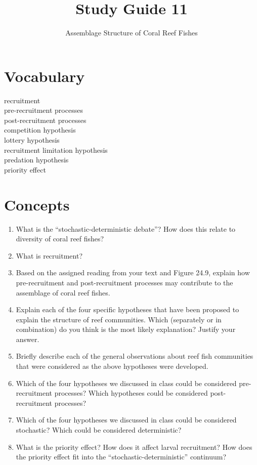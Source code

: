 \documentclass[letterpaper]{tufte-handout}
\title{Study Guide 11}
\author{Assemblage Structure of Coral Reef Fishes}
\date{} %
\begin{document}
\maketitle	%


\section{Vocabulary} 
\vspace{-1\baselineskip}
\begin{multicols}{2}
recruitment \\
pre-recruitment processes \\
post-recruitment processes \\
competition hypothesis \\
lottery hypothesis \\
recruitment limitation hypothesis \\
predation hypothesis \\
priority effect
\end{multicols}

\section{Concepts}

\begin{enumerate}
	\item What is the ``stochastic-deterministic debate''? How does this relate to diversity of coral reef fishes?

	\item What is recruitment?
	
	\item Based on the assigned reading from your text and Figure 24.9, explain how pre-recruitment and post-recruitment processes may contribute to the assemblage of coral reef fishes.
	
	\item Explain each of the four specific hypotheses that have been proposed to explain the structure of reef communities.  Which (separately or in combination) do you think is the most likely explanation?  Justify your answer.

	\item Briefly describe each of the general observations about reef fish communities that were considered as the above hypotheses were developed.
	
	\item Which of the four hypotheses we discussed in class could be considered pre-recruitment processes? Which hypotheses could be considered post-recruitment processes?
	
	\item Which of the four hypotheses we discussed in class could be considered stochastic?  Which could be considered deterministic?
	
	\item What is the priority effect? How does it affect larval recruitment? How does the priority effect fit into the ``stochastic-deterministic'' continuum?
	
\end{enumerate}
\end{document}

